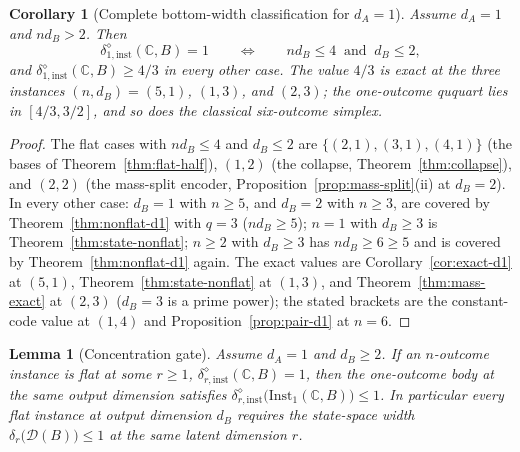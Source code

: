 \documentclass[11pt,a4paper]{article}
\newtheorem{lemma}[theorem]{Lemma}
\newtheorem{corollary}[theorem]{Corollary}
\newcommand{\Inst}{\mathrm{Inst}}
\begin{document}
\begin{corollary}[Complete bottom-width classification for $d_A=1$]
\label{cor:bottom-dichotomy}
Assume $d_A=1$ and $nd_B>2$. Then
\[
\delta_{1,\mathrm{inst}}^{\diamond}(\mathbb C,B)=1
\qquad\Longleftrightarrow\qquad
nd_B\le4\ \text{ and }\ d_B\le2,
\]
and $\delta_{1,\mathrm{inst}}^{\diamond}(\mathbb C,B)\ge4/3$ in every other case.
The value $4/3$ is exact at the three instances $(n,d_B)=(5,1)$, $(1,3)$, and
$(2,3)$; the one-outcome
ququart lies in $[4/3,3/2]$, and so does the classical six-outcome simplex.
\end{corollary}

\begin{proof}
The flat cases with $nd_B\le4$ and $d_B\le2$ are $\{(2,1),(3,1),(4,1)\}$ (the
bases of Theorem~\ref{thm:flat-half}), $(1,2)$ (the collapse,
Theorem~\ref{thm:collapse}), and $(2,2)$ (the mass-split encoder,
Proposition~\ref{prop:mass-split}(ii) at $d_B=2$). In every other case:
$d_B=1$ with $n\ge5$, and $d_B=2$ with $n\ge3$, are covered by
Theorem~\ref{thm:nonflat-d1} with $q=3$ ($nd_B\ge5$); $n=1$ with $d_B\ge3$ is
Theorem~\ref{thm:state-nonflat}; $n\ge2$ with $d_B\ge3$ has $nd_B\ge6\ge5$ and is
covered by Theorem~\ref{thm:nonflat-d1} again. The exact values are
Corollary~\ref{cor:exact-d1} at $(5,1)$, Theorem~\ref{thm:state-nonflat} at
$(1,3)$, and Theorem~\ref{thm:mass-exact} at $(2,3)$ ($d_B=3$ is a prime power);
the stated brackets are the constant-code value at $(1,4)$ and
Proposition~\ref{prop:pair-d1} at $n=6$.
\end{proof}

\begin{lemma}[Concentration gate]
\label{lem:slice-gate}
Assume $d_A=1$ and $d_B\ge2$. If an $n$-outcome instance is flat at some
$r\ge1$, $\delta_{r,\mathrm{inst}}^{\diamond}(\mathbb C,B)=1$, then the
one-outcome body at the same output dimension satisfies
$\delta_{r,\mathrm{inst}}^{\diamond}\bigl(\Inst_1(\mathbb C,B)\bigr)\le1$. In
particular every flat instance at output dimension $d_B$ requires the
state-space width $\delta_r\bigl(\mathcal D(B)\bigr)\le1$ at the same latent
dimension $r$.
\end{lemma}
\end{document}
